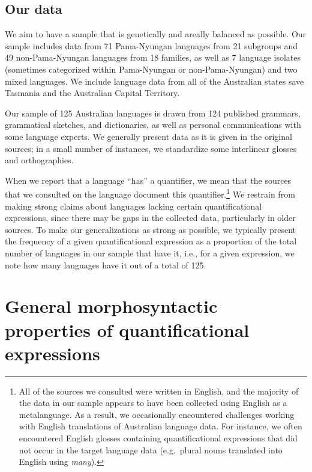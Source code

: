\documentclass[12pt,egregdoesnotlikesansseriftitles]{scrartcl}
\begin{document}
\subsection{Our data}


We aim to have a sample that is genetically and areally balanced as possible. Our sample includes data from 71 Pama-Nyungan languages from 21 subgroups and 49 non-Pama-Nyungan languages from 18 families, as well as 7 language isolates (sometimes categorized within Pama-Nyungan or non-Pama-Nyungan) and two mixed languages. We include language data from all of the Australian states save Tasmania and the Australian Capital Territory.

Our sample of 125 Australian languages  is drawn from 124 published grammars, grammatical sketches, and dictionaries, as well as personal communications with some language experts.  We generally present data as it is given in the original sources; in a small number of  instances, we standardize some interlinear glosses and orthographies.

When we report that a language ``has'' a quantifier, we mean that the sources that we consulted on the language document this quantifier.\footnote{All of the sources we consulted were written in English, and the majority of the data in our sample appears to have been collected using English as a metalanguage. As a result, we occasionally encountered challenges working with English translations of Australian language data. For instance, we often encountered English glosses containing quantificational expressions that did not occur in the target language data (e.g.\ plural nouns translated into English using \textit{many}).} We restrain from making strong claims about languages lacking certain quantificational
expressions, since there may be gaps in the collected data, particularly in older sources. To make our generalizations as strong as possible, we typically present the frequency of a given quantificational expression as a proportion of the total number of languages in our sample that have it, i.e., for a given expression, we note how many languages have it out of a total of 125.

\section{General morphosyntactic properties of  quantificational expressions}
\end{document}
